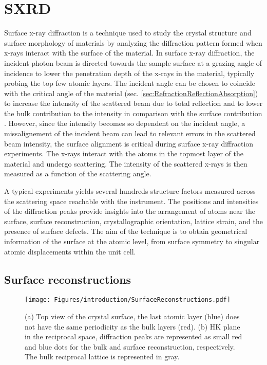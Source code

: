\section{SXRD} \label{sec:SXRD}

Surface x-ray diffraction is a technique used to study the crystal structure and surface morphology of materials by analyzing the diffraction pattern formed when x-rays interact with the surface of the material.
In surface x-ray diffraction, the incident photon beam is directed towards the sample surface at a grazing angle of incidence to lower the penetration depth of the x-rays in the material, typically probing the top few atomic layers.
The incident angle can be chosen to coincide with the critical angle of the material (sec. \ref{sec:RefractionReflectionAbsorption}) to increase the intensity of the scattered beam due to total reflection and to lower the bulk contribution to the intensity in comparison with the surface contribution \parencite{FEIDENHANSL1989105,moritz_van_hove_2022}.
However, since the intensity becomes so dependent on the incident angle, a missalignement of the incident beam can lead to relevant errors in the scattered beam intensity, the surface alignment is critical during surface x-ray diffraction experiments.
The x-rays interact with the atoms in the topmost layer of the material and undergo scattering.
The intensity of the scattered x-rays is then measured as a function of the scattering angle.

A typical experiments yields several hundreds structure factors measured across the scattering space reachable with the instrument.
The positions and intensities of the diffraction peaks provide insights into the arrangement of atoms near the surface, surface reconstruction, crystallographic orientation, lattice strain, and the presence of surface defects.
The aim of the technique is to obtain geometrical information of the surface at the atomic level, from surface symmetry to singular atomic displacements within the unit cell.

\subsection{Surface reconstructions} \label{sec:SurfaceReconstructions}

\begin{figure}[!htb]
    \centering
    \texttt{[image: Figures/introduction/SurfaceReconstructions.pdf]}
    \caption{
    (a) Top view of the crystal surface, the last atomic layer (blue) does not have the same periodicity as the bulk layers (red).
    (b) HK plane in the reciprocal space, diffraction peaks are represented as small red and blue dots for the bulk and surface reconstruction, respectively. The bulk reciprocal lattice is represented in gray.
    }
    \label{fig:SurfaceReconstructions}
\end{figure}

